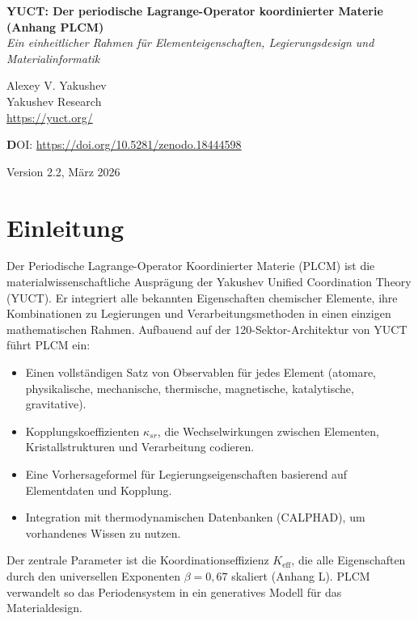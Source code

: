 \documentclass[12pt,a4paper]{article}
\newcommand{\Keff}{K_{\mathrm{eff}}}
\newcommand{\be}{\beta}
\begin{document}
	
	\begin{titlepage}
		\centering
		\vspace*{1cm}
		\Huge\textbf{YUCT: Der periodische Lagrange-Operator koordinierter Materie} \\
		\vspace{0.3cm}
		\Large\textbf{(Anhang PLCM)} \\
		\vspace{0.5cm}
		\large\textit{Ein einheitlicher Rahmen für Elementeigenschaften, Legierungsdesign und Materialinformatik}
		\vspace{2cm}
		
		\Large Alexey V. Yakushev \\
		\large Yakushev Research \\
		\url{https://yuct.org/}
		\vspace{2cm}
		
		\vspace{2cm}
		\textbf DOI: \url{https://doi.org/10.5281/zenodo.18444598}\\
		
		\vspace{1cm}
		
		\large Version 2.2, März 2026
		\vfill
	\end{titlepage}
	
	\tableofcontents
	\newpage
	
	\section{Einleitung}
	
	Der Periodische Lagrange-Operator Koordinierter Materie (PLCM) ist die materialwissenschaftliche Ausprägung der Yakushev Unified Coordination Theory (YUCT). Er integriert alle bekannten Eigenschaften chemischer Elemente, ihre Kombinationen zu Legierungen und Verarbeitungsmethoden in einen einzigen mathematischen Rahmen. Aufbauend auf der 120-Sektor-Architektur von YUCT führt PLCM ein:
	\begin{itemize}
		\item Einen vollständigen Satz von Observablen für jedes Element (atomare, physikalische, mechanische, thermische, magnetische, katalytische, gravitative).
		\item Kopplungskoeffizienten \(\kappa_{sr}\), die Wechselwirkungen zwischen Elementen, Kristallstrukturen und Verarbeitung codieren.
		\item Eine Vorhersageformel für Legierungseigenschaften basierend auf Elementdaten und Kopplung.
		\item Integration mit thermodynamischen Datenbanken (CALPHAD), um vorhandenes Wissen zu nutzen.
	\end{itemize}
	Der zentrale Parameter ist die Koordinationseffizienz \(\Keff\), die alle Eigenschaften durch den universellen Exponenten \(\be = 0,67\) skaliert (Anhang L). PLCM verwandelt so das Periodensystem in ein generatives Modell für das Materialdesign.
	
\end{document}
